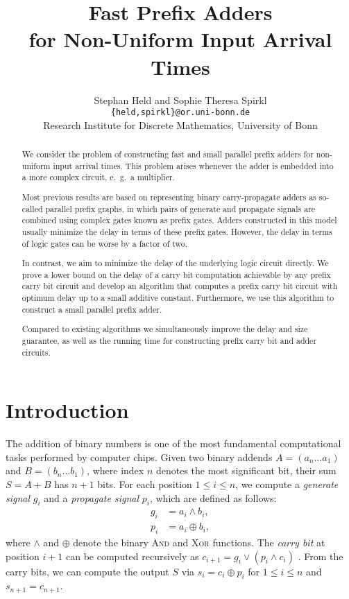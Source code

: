 \documentclass[11pt,final,microtype]{scrartcl}
\title{Fast Prefix Adders\\ for Non-Uniform Input Arrival Times}
\author{Stephan Held and Sophie Theresa Spirkl \\
\normalsize {\tt \{held,spirkl\}@or.uni-bonn.de}\\
  Research Institute for Discrete Mathematics, University of Bonn}
\date{}
\theoremstyle{plain}
\theoremstyle{definition}
\theoremstyle{remark}
\begin{document}
\maketitle

\begin{abstract}

  We consider the problem of constructing fast and small parallel
  prefix adders for non-uniform input arrival times. This problem
  arises whenever the adder is embedded into a more complex circuit,
  e.\ g.\ a multiplier.
  
  Most previous results are based on representing binary
  carry-propagate adders as so-called parallel prefix graphs, in which pairs of
  generate and propagate signals are combined using complex gates
  known as prefix gates. Adders constructed in this model usually
  minimize the delay in terms of these prefix gates. However, the delay
  in terms of logic gates can be worse by a factor of two.
  
  In contrast, we aim to minimize the delay of the underlying logic
  circuit directly.  We prove a lower bound on the delay of a carry
  bit computation achievable by any prefix carry bit circuit and
  develop an algorithm that computes a prefix carry bit circuit with
  optimum delay up to a small additive constant. Furthermore, we use
  this algorithm to construct a small parallel prefix adder.

  Compared to existing algorithms we simultaneously improve the delay
  and size guarantee, as well as the running time for constructing
  prefix carry bit and adder circuits.
\end{abstract}

\section{Introduction }

The addition of binary numbers is one of the most fundamental
computational tasks performed by computer chips.
Given two binary addends $A = (a_n \dots a_1)$ and $B = (b_n \dots b_1)$,
where index $n$ denotes the most significant bit, their sum $S = A+B$
has $n+1$ bits. For each position $1 \leq i \leq n$, we compute a
\emph{generate signal} $g_i$ and a \emph{propagate signal}
$p_i$, which are defined as follows:
\begin{equation}
\begin{array}{rl}
g_i &= a_i \wedge b_i,\\
p_i &= a_i \oplus b_i,
\end{array}
\label{eqn:generate-and-propagat}
\end{equation}
where $\wedge$ and $\oplus$ denote the binary \textsc{And} and
\textsc{Xor} functions.  The \emph{carry bit} at position $i+1$ can be
computed recursively as $c_{i+1} = g_i \vee (p_i \wedge c_i)$ \cite{Kno01,WS58}.
From the carry bits, we can compute the output $S$ via $s_i = c_i \oplus p_i$ for $1 \leq i\leq n$ and $s_{n+1} = c_{n+1}$.
\end{document}
